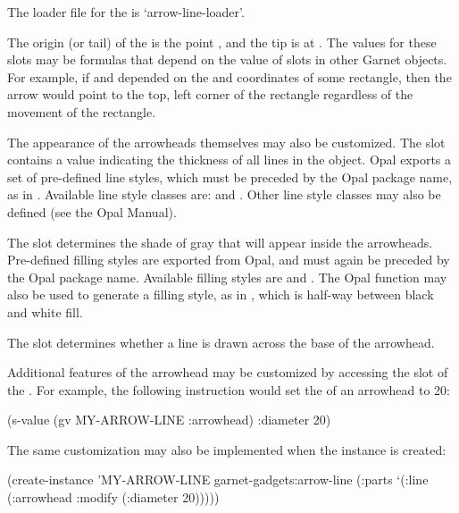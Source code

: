 The loader file for the  is `arrow-line-loader'.

The origin (or tail) of the  is the point
, and the tip is at .  The values for these
slots may be formulas that depend on the value of slots in other
Garnet objects.  For example, if  and  depended on the
 and  coordinates of some rectangle, then the arrow
would point to the top, left corner of the rectangle regardless of the
movement of the rectangle.

The appearance of the arrowheads themselves may also be customized.
The  slot contains a value indicating the thickness of
all lines in the  object.  Opal exports a set of
pre-defined line styles, which must be preceded by the Opal package
name, as in .  Available line style classes are:
 and .  Other line style classes may also
be defined (see the Opal Manual).

The slot  determines the shade of gray that will
appear inside the arrowheads.  Pre-defined filling styles are exported
from Opal, and must again be preceded by the Opal package name.
Available filling styles are  and .
The Opal function  may also be used to generate a filling
style, as in , which is
half-way between black and white fill.

The slot  determines whether a line is drawn across the
base of the arrowhead.

\vspace{1 line}
\begin{group}
Additional features of the arrowhead may be customized
by accessing the slot  of the .  For
example, the following instruction would set the  of an
 arrowhead to 20:
\begin{programexample}
(s-value (gv MY-ARROW-LINE :arrowhead) :diameter 20)
\end{programexample}
\end{group}

\begin{group}
The same customization may also be implemented when the instance is created:
\begin{programexample}
(create-instance 'MY-ARROW-LINE garnet-gadgets:arrow-line
   (:parts `(:line (:arrowhead :modify
                               (:diameter 20)))))
\end{programexample}
\end{group}


